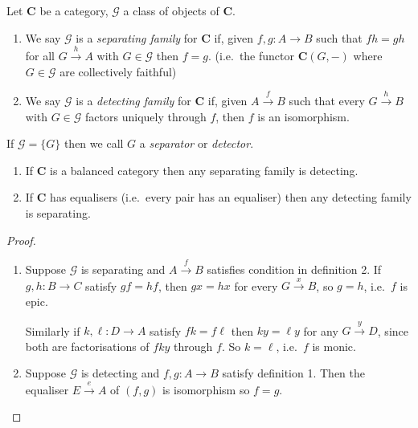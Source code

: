 \documentclass[a4paper]{article}
\renewcommand{\c}[1]{\mathbf{#1}}
\begin{document}
\begin{definition}
  Let \(\c C\) be a category, \(\mathcal G\) a class of objects of \(\c C\).
  \begin{enumerate}
  \item  We say \(\mathcal G\) is a \emph{separating family} for \(\c C\) if, given \(f, g: A \to B\) such that \(fh = gh\) for all \(G \xrightarrow{h} A\) with \(G \in \mathcal G\) then \(f = g\). (i.e.\ the functor \(\c C(G, -)\) where \(G \in \mathcal G\) are collectively faithful)
  \item We say \(\mathcal G\) is a \emph{detecting family}  for \(\c C\) if, given \(A \xrightarrow{f} B\) such that every \(G \xrightarrow{h} B\) with \(G \in \mathcal G\) factors uniquely through \(f\), then \(f\) is an isomorphism.
  \end{enumerate}

  If \(\mathcal G = \{G\}\) then we call \(G\) a \emph{separator} or \emph{detector}.
\end{definition}

\begin{lemma}\leavevmode
  \begin{enumerate}
  \item If \(\c C\) is a balanced category then any separating family is detecting.
  \item If \(\c C\) has equalisers (i.e.\ every pair has an equaliser) then any detecting family is separating.
  \end{enumerate}
\end{lemma}

\begin{proof}\leavevmode
  \begin{enumerate}
  \item Suppose \(\mathcal G\) is separating and \(A \xrightarrow{f} B\) satisfies condition in definition 2.
    If \(g, h: B \to C\) satisfy \(gf = hf\), then \(gx = hx\) for every \(G \xrightarrow{x} B\), so \(g = h\), i.e.\ \(f\) is epic.

    Similarly if \(k, \ell: D \to A\) satisfy \(fk = f\ell\) then \(ky = \ell y\) for any \(G \xrightarrow{y} D\), since both are factorisations of \(fky\) through \(f\). So \(k = \ell\), i.e.\ \(f\) is monic.
  \item Suppose \(\mathcal G\) is detecting and \(f, g: A \to B\) satisfy definition 1. Then the equaliser \(E \xrightarrow{e} A\) of \((f, g)\) is isomorphism so \(f = g\).
  \end{enumerate}
\end{proof}
\end{document}
